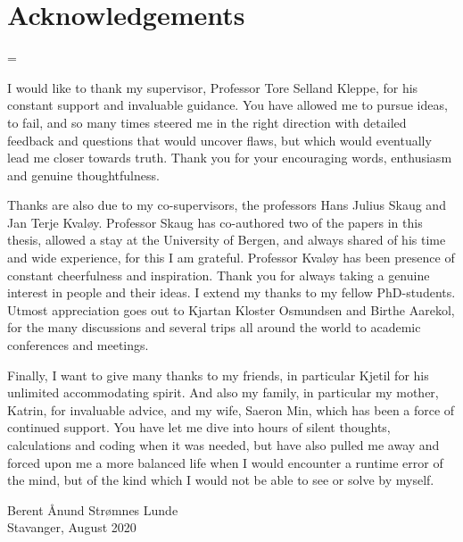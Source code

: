 \chapter*{Acknowledgements}

\emergencystretch=\maxdimen
{}

I would like to thank my supervisor, Professor Tore Selland Kleppe, for his constant support and invaluable guidance. You have allowed me to 
pursue ideas, to fail, and so many times steered me in the right direction with detailed feedback and questions that would uncover flaws, but which would eventually lead me closer towards truth.
Thank you for your encouraging words, enthusiasm and genuine thoughtfulness.

Thanks are also due to my co-supervisors, the professors Hans Julius Skaug and Jan Terje Kvaløy.
Professor Skaug has co-authored two of the papers in this thesis, allowed a stay at the University of Bergen, and always shared of his time and wide experience, for this I am grateful.
Professor Kvaløy has been presence of constant cheerfulness and inspiration. Thank you for always taking a genuine interest in people and their ideas.
I extend my thanks to my fellow PhD-students. Utmost appreciation goes out to Kjartan Kloster Osmundsen and Birthe Aarekol, for the many discussions and several trips all around the world to academic conferences and meetings.


Finally, I want to give many thanks to my friends, in particular Kjetil for his unlimited accommodating spirit. And also my family, in particular my mother, Katrin, for invaluable advice, and my wife, Saeron Min, which has been a force of continued support. 
You have let me dive into hours of silent thoughts, calculations and coding when it was needed, but have also pulled me away and forced upon me a more balanced life when I would encounter a runtime error of the mind, but of the kind which I would not be able to see or solve by myself.
\vspace{60pt}

Berent Ånund Strømnes Lunde\\
Stavanger, August 2020